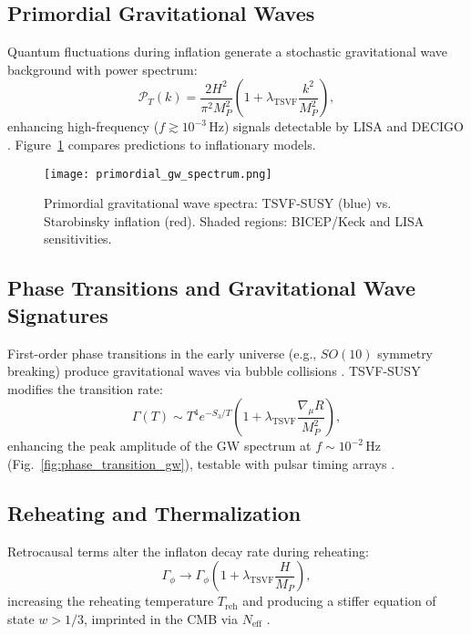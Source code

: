 \documentclass[twocolumn,superscriptaddress,floatfix]{revtex4-2}
\begin{document}
\subsection{Primordial Gravitational Waves}  
\label{subsec:primordial_gw}  

Quantum fluctuations during inflation generate a stochastic gravitational wave background with power spectrum:  
\begin{equation}  
\mathcal{P}_T(k) = \frac{2H^2}{\pi^2 M_P^2} \left(1 + \lambda_{\text{TSVF}} \frac{k^2}{M_P^2}\right),  
\label{eq:gw_power}  
\end{equation}  
enhancing high-frequency (\(f \gtrsim 10^{-3} \, \text{Hz}\)) signals detectable by LISA \cite{Amaro-Seoane2017} and DECIGO \cite{Kawamura2020}. Figure~\ref{fig:primordial_gw} compares predictions to inflationary models.  

\begin{figure}[htbp]  
\centering  
\texttt{[image: primordial\_gw\_spectrum.png]}  
\caption{Primordial gravitational wave spectra: TSVF-SUSY (blue) vs. Starobinsky inflation (red). Shaded regions: BICEP/Keck \cite{BICEP2021} and LISA sensitivities.}  
\label{fig:primordial_gw}  
\end{figure}  

\subsection{Phase Transitions and Gravitational Wave Signatures}  
\label{subsec:phase_transitions}  

First-order phase transitions in the early universe (e.g., \(SO(10)\) symmetry breaking) produce gravitational waves via bubble collisions \cite{Kosowsky1992}. TSVF-SUSY modifies the transition rate:  
\begin{equation}  
\Gamma(T) \sim T^4 e^{-S_3/T} \left(1 + \lambda_{\text{TSVF}} \frac{\nabla_\mu R}{M_P^2}\right),  
\label{eq:phase_transition}  
\end{equation}  
enhancing the peak amplitude of the GW spectrum at \(f \sim 10^{-2} \, \text{Hz}\) (Fig.~\ref{fig:phase_transition_gw}), testable with pulsar timing arrays \cite{IPTA2021}.  

\subsection{Reheating and Thermalization}  
\label{subsec:reheating}  

Retrocausal terms alter the inflaton decay rate during reheating:  
\begin{equation}  
\Gamma_\phi \to \Gamma_\phi \left(1 + \lambda_{\text{TSVF}} \frac{H}{M_P}\right),  
\label{eq:reheating}  
\end{equation}  
increasing the reheating temperature \(T_{\text{reh}}\) and producing a stiffer equation of state \(w > 1/3\), imprinted in the CMB via \(N_{\text{eff}}\) \cite{Planck2018}.  
\end{document}

